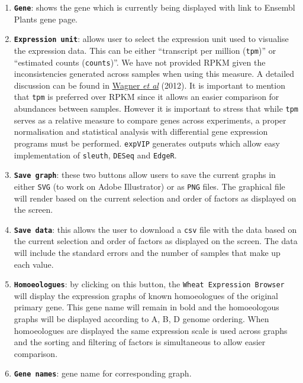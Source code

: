\begin{enumerate}
\def\labelenumi{\arabic{enumi}.}
\item
  \textbf{\lstinline!Gene!}: shows the gene which is currently being
  displayed with link to Ensembl Plants gene page.
\item
  \textbf{\lstinline!Expression unit!}: allows user to select the
  expression unit used to visualise the expression data. This can be
  either ``transcript per million (\lstinline!tpm!)'' or ``estimated
  counts (\lstinline!counts!)''. We have not provided RPKM given the
  inconsistencies generated across samples when using this measure. A
  detailed discussion can be found in
  \href{http://www.ncbi.nlm.nih.gov/pubmed/22872506}{Wagner \emph{et
  al}} (2012). It is important to mention that \lstinline!tpm! is
  preferred over RPKM since it allows an easier comparison for
  abundances between samples. However it is important to stress that
  while \lstinline!tpm! serves as a relative measure to compare genes
  across experiments, a proper normalisation and statistical analysis
  with differential gene expression programs must be performed.
  \lstinline!expVIP! generates outputs which allow easy implementation
  of \lstinline!sleuth!, \lstinline!DESeq! and \lstinline!EdgeR!.
\item
  \textbf{\lstinline!Save graph!}: these two buttons allow users to save
  the current graphs in either \lstinline!SVG! (to work on Adobe
  Illustrator) or as \lstinline!PNG! files. The graphical file will
  render based on the current selection and order of factors as
  displayed on the screen.
\item
  \textbf{\lstinline!Save data!}: this allows the user to download a
  \lstinline!csv! file with the data based on the current selection and
  order of factors as displayed on the screen. The data will include the
  standard errors and the number of samples that make up each value.
\item
  \textbf{\lstinline!Homoeologues!}: by clicking on this button, the
  \lstinline!Wheat Expression Browser! will display the expression
  graphs of known homoeologues of the original primary gene. This gene
  name will remain in bold and the homoeologous graphs will be displayed
  according to A, B, D genome ordering. When homoeologues are displayed
  the same expression scale is used across graphs and the sorting and
  filtering of factors is simultaneous to allow easier comparison.
\item
  \textbf{\lstinline!Gene names!}: gene name for corresponding graph.

\end{enumerate}
